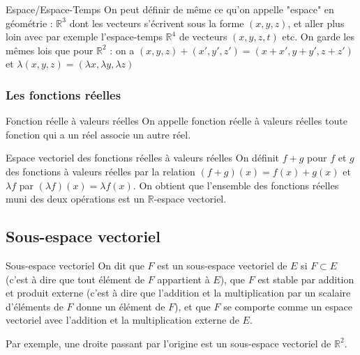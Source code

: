 \documentclass{classe}
\begin{document}
\begin{définition}{Espace/Espace-Temps}{}
On peut définir de même ce qu'on appelle "espace" en géométrie : $\mathbb{R}^3$ dont les vecteurs s'écrivent sous la forme $(x, y, z)$, et aller plus loin avec par exemple l'espace-temps $\mathbb{R}^4$ de vecteurs $(x, y, z, t)$ etc. On garde les mêmes lois que pour $\mathbb{R}^2$ : on a $(x, y, z) + (x', y', z') = (x+x', y+y', z+z')$ et $\lambda(x, y, z) = (\lambda x, \lambda y, \lambda z)$
\end{définition}

\subsubsection{Les fonctions réelles}

\begin{définition}{Fonction réelle à valeurs réelles}{}
On appelle fonction réelle à valeurs réelles toute fonction qui a un réel associe un autre réel.
\end{définition}

\begin{théorème}{Espace vectoriel des fonctions réelles à valeurs réelles}{}
On définit $f+g$ pour $f$ et $g$ des fonctions à valeurs réelles par la relation $(f+g)(x) = f(x)+g(x)$ et $\lambda f$ par $(\lambda f)(x) = \lambda f(x)$. On obtient que l'ensemble des fonctions réelles muni des deux opérations est un $\mathbb{R}$-espace vectoriel.
\end{théorème}

\subsection{Sous-espace vectoriel}

\begin{définition}{Sous-espace vectoriel}{}
	On dit que $F$ est un sous-espace vectoriel de $E$ si $F\subset E$ (c'est à dire que tout élément de $F$ appartient à $E$), que $F$ est stable par addition et produit externe (c'est à dire que l'addition et la multiplication par un scalaire d'éléments de $F$ donne un élément de $F$), et que $F$ se comporte comme un espace vectoriel avec l'addition et la multiplication externe de $E$.
\end{définition}

\begin{example}{}
	Par exemple, une droite passant par l'origine est un sous-espace vectoriel de $\mathbb{R}^2$.
\end{example}
\end{document}
